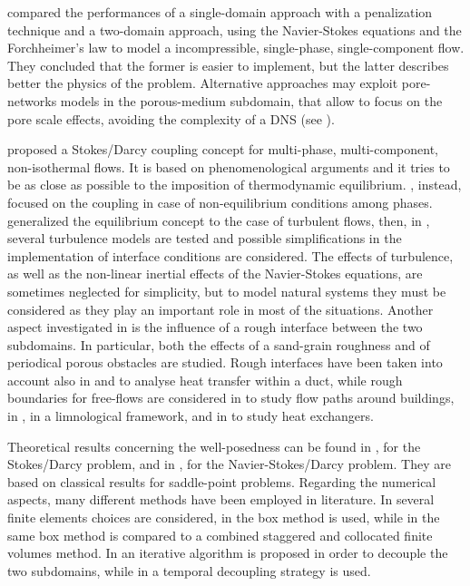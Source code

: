 \textcite{intro:discacim} compared the performances of a single-domain approach with a penalization technique and a 
two-domain approach, using the Navier-Stokes equations and the Forchheimer's law to model a incompressible, single-phase, single-component flow. They concluded that the former is easier to implement, but the latter describes better the physics of the problem. Alternative approaches may exploit pore-networks models in the porous-medium subdomain, that allow to focus on the pore scale effects, avoiding the complexity of a DNS (see \cite{paper:kilian}).

\textcite{paper:mosthaf} proposed a Stokes/Darcy coupling concept for multi-phase, 
multi-component, non-isothermal flows. It is based on phenomenological arguments and it tries to be as close as possible to the 
imposition of thermodynamic equilibrium. \textcite{intro:davarzani}, instead, focused on the coupling in case of non-equilibrium conditions among phases.
\textcite{paper:fetzer} generalized the equilibrium concept to the case of turbulent flows, then, in \cite{tesi:fetzer}, several turbulence models are tested and possible simplifications in the implementation of interface conditions are considered. The effects of turbulence, as well as the non-linear inertial effects of the Navier-Stokes equations, are sometimes neglected for simplicity, but to model natural systems they must be considered as they play an important role in most of the situations. Another aspect investigated in \cite{tesi:fetzer} is the influence of a rough interface between the two subdomains. In particular, both the effects of a sand-grain roughness and of periodical porous obstacles are studied.
Rough interfaces have been taken into account also in \cite{intro:kuzbek} and \cite{intro:kuz} to analyse heat transfer within a duct, while rough boundaries for free-flows are considered in \cite{lien:obstacles} to study flow paths around buildings, in \cite{intro:limnology}, in a limnological framework, and in \cite{intro:targui} to study heat exchangers.

Theoretical results concerning the well-posedness can be found in \cite{intro:disca}, for the Stokes/Darcy problem, and in \cite{intro:disca2009}, for the Navier-Stokes/Darcy problem. They are based on classical results for saddle-point problems. Regarding the numerical aspects, many different methods have been employed in literature. In \cite{intro:disca2009} several finite elements choices are considered, in \cite{tesi:mosthaf} the box method is used, while in \cite{tesi:fetzer} the same box method is compared to a combined staggered and collocated finite volumes method. In \cite{intro:disca} an iterative algorithm is proposed in order to decouple the two subdomains, while in \cite{intro:rybak} a temporal decoupling strategy is used.

